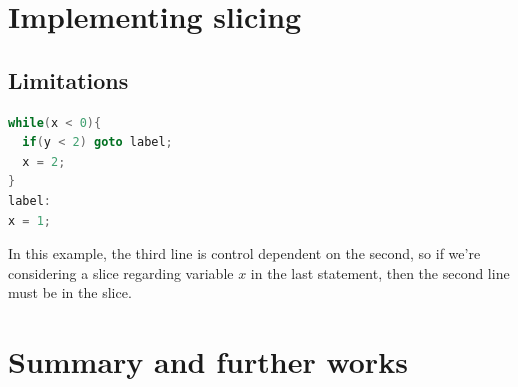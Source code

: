 \documentclass[oneside,12pt,a4paper]{book}
\begin{document}
\section{Implementing slicing}

\subsection{Limitations}

\begin{lstlisting}[language=C++]
while(x < 0){
  if(y < 2) goto label; 
  x = 2;
}
label:
x = 1;
\end{lstlisting}

In this example, the third line is control dependent on the second, so if we're considering a slice regarding variable $x$ in the last statement, then the second line must be in the slice.



\section{Summary and further works}
\end{document}
